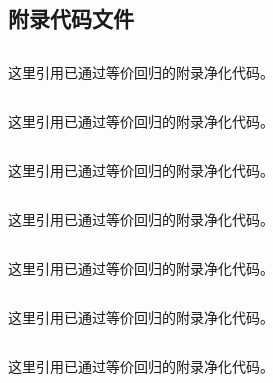 \documentclass[12pt,a4paper]{article}
\begin{document}
\begin{appendices}
\section{附录代码文件}

\subsection{}

这里引用已通过等价回归的附录净化代码。

\subsection{}

这里引用已通过等价回归的附录净化代码。

\subsection{}

这里引用已通过等价回归的附录净化代码。

\subsection{}

这里引用已通过等价回归的附录净化代码。

\subsection{}

这里引用已通过等价回归的附录净化代码。

\subsection{}

这里引用已通过等价回归的附录净化代码。

\subsection{}

这里引用已通过等价回归的附录净化代码。

\subsection{}


\end{appendices}
\end{document}
